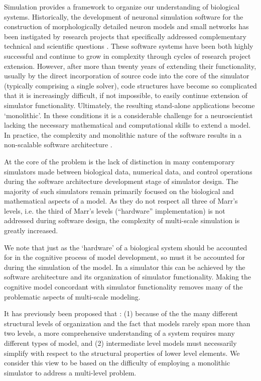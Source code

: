 \documentclass[11pt,3p,twocolumn]{JMN}
\begin{document}
Simulation provides a framework to organize our understanding of biological systems. Historically, the development of neuronal simulation software for the construction of morphologically detailed neuron models and small networks has been instigated by research projects that specifically addressed complementary technical and scientific questions \cite{Moore:2010vn}. These software systems have been both highly successful and continue to grow in complexity through cycles of research project extension. However, after more than twenty years of extending their functionality, usually by the direct incorporation of source code into the core of the simulator (typically comprising a single solver), code structures have become so complicated that it is increasingly difficult, if not impossible, to easily continue extension of simulator functionality. Ultimately, the resulting stand-alone applications become `monolithic'. In these conditions it is a considerable challenge for a neuroscientist lacking the necessary mathematical and computational skills to extend a model. In practice, the complexity and monolithic nature of the software results in a non-scalable software architecture \cite{jaeger02:_comput_neuros_realis_model_exper}.

At the core of the problem is the lack of distinction in many contemporary simulators made between biological data, numerical data, and control operations during the software architecture development stage of simulator design. The majority of such simulators remain primarily focused on the biological and mathematical aspects of a model. As they do not respect all three of Marr's levels, i.e. the third of Marr's levels (``hardware'' implementation) is not addressed during software design, the complexity of multi-scale simulation is greatly increased. 

We note that just as the `hardware' of a biological system should be accounted for in the cognitive process of model development, so must it be accounted for during the simulation of the model. In a simulator this can be achieved by the software architecture and its organization of simulator functionality. Making the cognitive model concordant with simulator functionality removes many of the problematic aspects of multi-scale modeling.  

It has previously been proposed that \cite{Sejnowski:1988fk}: (1) because of the the many different structural levels of organization and the fact that models rarely span more than two levels, a more comprehensive understanding of a system requires many different types of model, and (2) intermediate level models must necessarily simplify with respect to the structural properties of lower level elements. We consider this view to be based on the difficulty of employing a monolithic simulator to address a multi-level problem.
\end{document}
